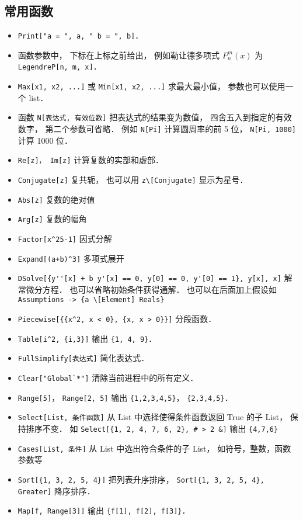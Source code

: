\subsection{常用函数}
\begin{itemize}
\item \verb|Print["a = ", a, " b = ", b]|．
\item 函数参数中， 下标在上标之前给出， 例如勒让德多项式 $P_n^m(x)$ 为 \verb|LegendreP[n, m, x]|．
\item \verb|Max[x1, x2, ...]| 或 \verb|Min[x1, x2, ...]| 求最大最小值， 参数也可以使用一个 list．
\item 函数 \verb|N[表达式, 有效位数]| 把表达式的结果变为数值， 四舍五入到指定的有效数字， 第二个参数可省略． 例如 \verb|N[Pi]| 计算圆周率的前 5 位， \verb|N[Pi, 1000]| 计算 1000 位．
\item \verb|Re[z]， Im[z]| 计算复数的实部和虚部．
\item \verb|Conjugate[z]| 复共轭， 也可以用 \verb|z\[Conjugate]| 显示为星号．
\item \verb|Abs[z]| 复数的绝对值
\item \verb|Arg[z]| 复数的幅角
\item \verb|Factor[x^25-1]| 因式分解
\item \verb|Expand[(a+b)^3]| 多项式展开
\item \verb|DSolve[{y''[x] + b y'[x] == 0, y[0] == 0, y'[0] == 1}, y[x], x]| 解常微分方程． 也可以省略初始条件获得通解． 也可以在后面加上假设如 \verb|Assumptions -> {a \[Element] Reals}|
\item \verb|Piecewise[{{x^2, x < 0}, {x, x > 0}}]| 分段函数．
\item \verb|Table[i^2, {i,3}]| 输出 \verb|{1, 4, 9}|．
\item \verb|FullSimplify[表达式]| 简化表达式．
\item \verb|Clear["Global`*"]| 清除当前进程中的所有定义．
\item \verb|Range[5]|， \verb|Range[2, 5]| 输出 \verb|{1,2,3,4,5}|， \verb|{2,3,4,5}|．
\item \verb|Select[List, 条件函数]| 从 List 中选择使得条件函数返回 True 的子 List， 保持排序不变． 如 \verb|Select[{1, 2, 4, 7, 6, 2}, # > 2 &]| 输出 \verb|{4,7,6}|
\item \verb|Cases[List, 条件]| 从 List 中选出符合条件的子 List， 如符号，整数，函数参数等
\item \verb|Sort[{1, 3, 2, 5, 4}]| 把列表升序排序， \verb|Sort[{1, 3, 2, 5, 4}, Greater]| 降序排序． 
\item \verb|Map[f, Range[3]]| 输出 \verb|{f[1], f[2], f[3]}|．

\end{itemize}
